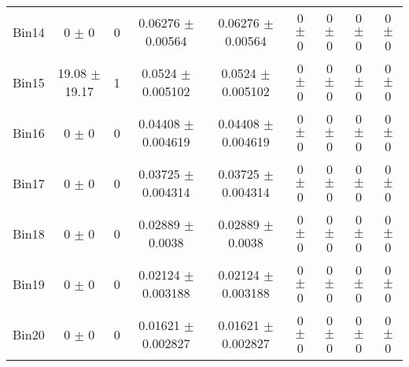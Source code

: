 \begin{tabular}{@{\extracolsep{4pt}}lcccccccc@{}}
     Bin14 & 0 $\pm$ 0 & 0 & 0.06276 $\pm$ 0.00564 & 0.06276 $\pm$ 0.00564 & 0 $\pm$ 0 & 0 $\pm$ 0 & 0 $\pm$ 0 & 0 $\pm$ 0 \\ 
     Bin15 & 19.08 $\pm$ 19.17 & 1 & 0.0524 $\pm$ 0.005102 & 0.0524 $\pm$ 0.005102 & 0 $\pm$ 0 & 0 $\pm$ 0 & 0 $\pm$ 0 & 0 $\pm$ 0 \\ 
     Bin16 & 0 $\pm$ 0 & 0 & 0.04408 $\pm$ 0.004619 & 0.04408 $\pm$ 0.004619 & 0 $\pm$ 0 & 0 $\pm$ 0 & 0 $\pm$ 0 & 0 $\pm$ 0 \\ 
     Bin17 & 0 $\pm$ 0 & 0 & 0.03725 $\pm$ 0.004314 & 0.03725 $\pm$ 0.004314 & 0 $\pm$ 0 & 0 $\pm$ 0 & 0 $\pm$ 0 & 0 $\pm$ 0 \\ 
     Bin18 & 0 $\pm$ 0 & 0 & 0.02889 $\pm$ 0.0038 & 0.02889 $\pm$ 0.0038 & 0 $\pm$ 0 & 0 $\pm$ 0 & 0 $\pm$ 0 & 0 $\pm$ 0 \\ 
     Bin19 & 0 $\pm$ 0 & 0 & 0.02124 $\pm$ 0.003188 & 0.02124 $\pm$ 0.003188 & 0 $\pm$ 0 & 0 $\pm$ 0 & 0 $\pm$ 0 & 0 $\pm$ 0 \\ 
     Bin20 & 0 $\pm$ 0 & 0 & 0.01621 $\pm$ 0.002827 & 0.01621 $\pm$ 0.002827 & 0 $\pm$ 0 & 0 $\pm$ 0 & 0 $\pm$ 0 & 0 $\pm$ 0 \\ 
\hline\hline
  \end{tabular}
